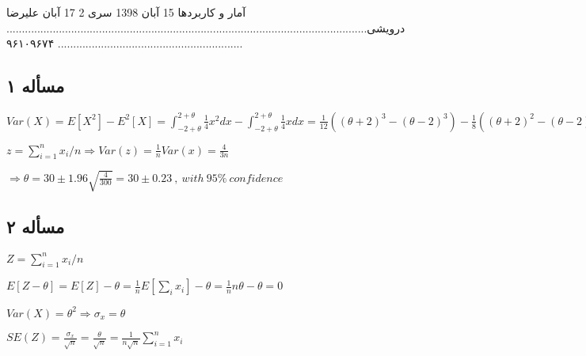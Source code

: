 \documentclass[12pt]{article}
\begin{document}
\handout
{آمار و کاربردها}
{}
{15 آبان 1398}
{سری 2}
{17 آبان}
علیرضا درویشی................................................................................................................................................................................. ۹۶۱۰۹۶۷۴
\subsection*{مسأله ۱}
\begin{flushleft}
$Var(X)=E[X^2]-E^2[X]=\int_{-2+\theta}^{2+\theta} \frac{1}{4}x^2dx-\int_{-2+\theta}^{2+\theta} \frac{1}{4}xdx=
\frac{1}{12}((\theta+2)^3-(\theta-2)^3)-\frac{1}{8}((\theta+2)^2-(\theta-2)^2)=
\frac{4}{3}$

$z=\sum_{i=1}^n x_i/n\Rightarrow Var(z)=\frac{1}{n}Var(x)=\frac{4}{3n}$

$\Rightarrow \theta=30\pm1.96 \sqrt{\frac{4}{300}}=30\pm 0.23\  ,\ with\ 95\% \ confidence$
\end{flushleft}

\subsection*{مسأله‌ ۲}
\begin{flushleft}
$Z=\sum_{i=1}^nx_i/n$

$E[Z-\theta]=E[Z]-\theta=\frac{1}{n}E[\sum_ix_i]-\theta=\frac{1}{n}n\theta-\theta=0$

$Var(X)=\theta^2\Rightarrow \sigma_x=\theta$

$SE(Z)=\frac{\sigma_x}{\sqrt{n}}=\frac{\theta}{\sqrt{n}}=\frac{1}{n\sqrt{n}}\sum_{i=1}^nx_i$
\end{flushleft}
\end{document}
